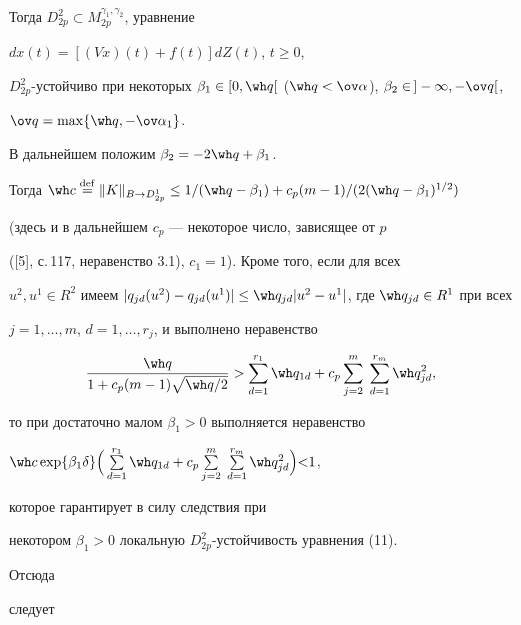 Тогда $D^2_{2p}\subset M^{\gamma_1,\gamma_2}_{2p}$, уравнение 


$d x(t)=[(V x)(t)+f(t)]d Z(t)$, $t\ge0$, 


$D^2_{2p}$-устойчиво при некоторых $\beta_1\in[0,\wh q[$ ($\wh 


q<\ov\alpha$), $\beta_2\in\,]-\infty,-\ov q[$, 


$\ov q=\max\{\wh q,-\ov\alpha_1\}$. 


В дальнейшем положим $\beta_2=-2\wh q+\beta_1$. 


Тогда $\wh c\eqdef\|K\|_{B\to D^1_{2p}}\le 1/(\wh q-\beta_1) 


+c_p(m-1)/(2(\wh q-\beta_1)^{1/2})$ 


(здесь и в дальнейшем $c_p$ --- некоторое число, зависящее от $p$ 


([5], с.\,117, неравенство 3.1), $c_1=1$). Кроме того, если для всех 


$u^2,u^1\in R^2$ имеем $|q_{j d}(u^2)-q_{j d}(u^1)|\le\wh q_{j 


d}|u^2-u^1|$, где $\wh q_{j d}\in R^1$ при всех 


$j=1,\dotsc,m$, $d=1,\dotsc,r_j$, и выполнено неравенство 


$$ 


\frac{\wh q}{1+c_p(m-1)\sqrt{\wh q/2}}> 


\sum^{r_1}_{d=1}\wh q_{1d}+c_p\sum^m_{j=2}\; 


\sum^{r_m}_{d=1}\wh q^2_{j d}, 


$$ 


то при достаточно малом $\beta_1>0$ выполняется неравенство 


$\wh c\exp\{\beta_1\delta\}\Big(\sum\limits^{r_1}_{d=1} 


\wh q_{1d}+c_p\sum\limits^m_{j=2}\; 


\sum\limits^{r_m}_{d=1}\wh q^2_{j d}\Big){<}1$, 


которое гарантирует в силу следствия при 


некотором $\beta_1>0$ локальную $D^2_{2p}$-устойчивость уравнения (11). 


Отсюда 


следует 


 



